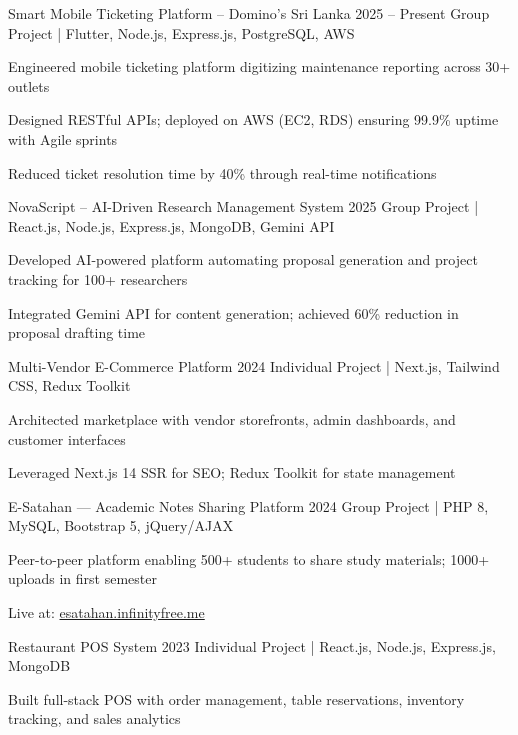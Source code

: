 \documentclass[letterpaper,10.8pt]{article}
\begin{document}
{Smart Mobile Ticketing Platform – Domino's Sri Lanka}
{2025 – Present}
{Group Project | Flutter, Node.js, Express.js, PostgreSQL, AWS}{
  \item Engineered mobile ticketing platform digitizing maintenance reporting across 30+ outlets
  \item Designed RESTful APIs; deployed on AWS (EC2, RDS) ensuring 99.9\% uptime with Agile sprints
  \item Reduced ticket resolution time by 40\% through real-time notifications
}

\vspace{8pt}

{NovaScript – AI-Driven Research Management System}
{2025}
{Group Project | React.js, Node.js, Express.js, MongoDB, Gemini API}{
  \item Developed AI-powered platform automating proposal generation and project tracking for 100+ researchers
  \item Integrated Gemini API for content generation; achieved 60\% reduction in proposal drafting time
}

\vspace{8pt}

{Multi-Vendor E-Commerce Platform}
{2024}
{Individual Project | Next.js, Tailwind CSS, Redux Toolkit}{
  \item Architected marketplace with vendor storefronts, admin dashboards, and customer interfaces
  \item Leveraged Next.js 14 SSR for SEO; Redux Toolkit for state management
}

\newpage

{E-Satahan — Academic Notes Sharing Platform}
{2024}
{Group Project | PHP 8, MySQL, Bootstrap 5, jQuery/AJAX}{
  \item Peer-to-peer platform enabling 500+ students to share study materials; 1000+ uploads in first semester
  \item Live at: \href{https://esatahan.infinityfree.me}{esatahan.infinityfree.me}
}

\vspace{8pt}

{Restaurant POS System}
{2023}
{Individual Project | React.js, Node.js, Express.js, MongoDB}{
  \item Built full-stack POS with order management, table reservations, inventory tracking, and sales analytics
}
\end{document}

